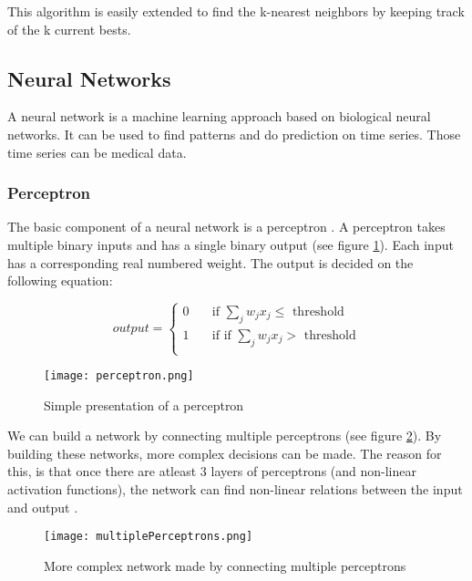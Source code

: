 This algorithm is easily extended to find the k-nearest neighbors by keeping track of the k current bests.
	
	\subsection{Neural Networks}
	
A neural network is a machine learning approach based on biological neural networks. It can be used to find patterns and do prediction on time series. Those time series can be medical data.


		\subsubsection{Perceptron}

The basic component of a neural network is a perceptron \cite{perceptron:article}. A perceptron takes multiple binary inputs and has a single binary output (see figure \ref{fig:perceptron}). Each input has a corresponding real numbered weight. The output is decided on the following equation:

\begin{equation} 
output =
  \begin{cases}
    0       	& \quad \text{if } \sum_j w_jx_j \leq \text{ threshold}\\
    1  		& \quad \text{if } \text{if } \sum_j w_jx_j > \text{ threshold}\\
  \end{cases}
\end{equation}
	
\begin{figure}[htbp]
	\centering
	\texttt{[image: perceptron.png]}
	\caption{Simple presentation of a perceptron \cite{NNintro:online}}
	\label{fig:perceptron}
\end{figure}

We can build a network by connecting multiple perceptrons (see figure \ref{fig:multiplePerceptrons}). By building these networks, more complex decisions can be made. The reason for this, is that once there are atleast $3$ layers of perceptrons (and non-linear activation functions), the network can find non-linear relations between the input and output \cite{nnNL:article}.

\begin{figure}[htbp]
	\centering
	\texttt{[image: multiplePerceptrons.png]}
	\caption{More complex network made by connecting multiple perceptrons \cite{NNintro:online}}
	\label{fig:multiplePerceptrons}
\end{figure}

